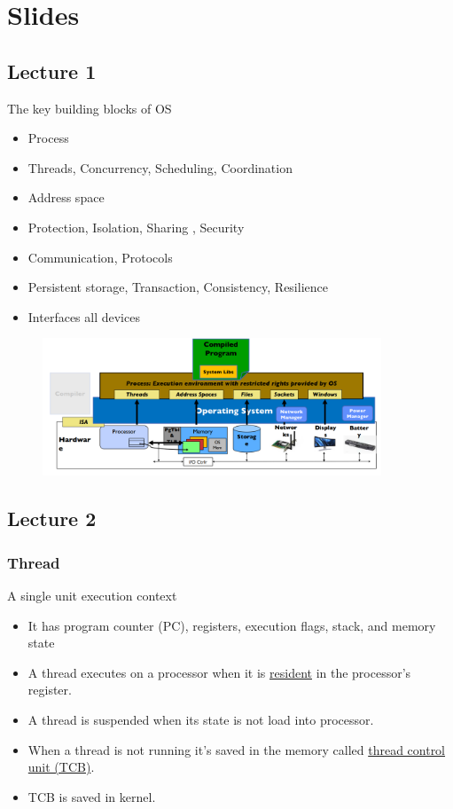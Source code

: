 \chapter{Slides}
\section{Lecture 1}
The key building blocks of OS
\begin{itemize}
    \item Process 
    \item Threads, Concurrency, Scheduling, Coordination
    \item Address space
    \item Protection, Isolation, Sharing , Security
    \item Communication, Protocols
    \item Persistent storage, Transaction, Consistency, Resilience
    \item Interfaces all devices
\end{itemize}

\begin{figure}
    \centering
    \includegraphics[width = 0.9\textwidth]{Chapters/graphics/OSAbstraction.png}
\end{figure}

\section{Lecture 2}
\subsection{Thread}
A single unit execution context 
\begin{itemize}
    \item It has program counter (PC), registers, execution flags, stack, and memory state
    \item A thread executes on a processor when it is \underline{resident} in the processor's register.
    \item A thread is suspended when its state is not load into processor.
    \item When a thread is not running it's saved in the memory called \underline{thread control unit (TCB)}. 
    \item TCB is saved in kernel.
\end{itemize}

